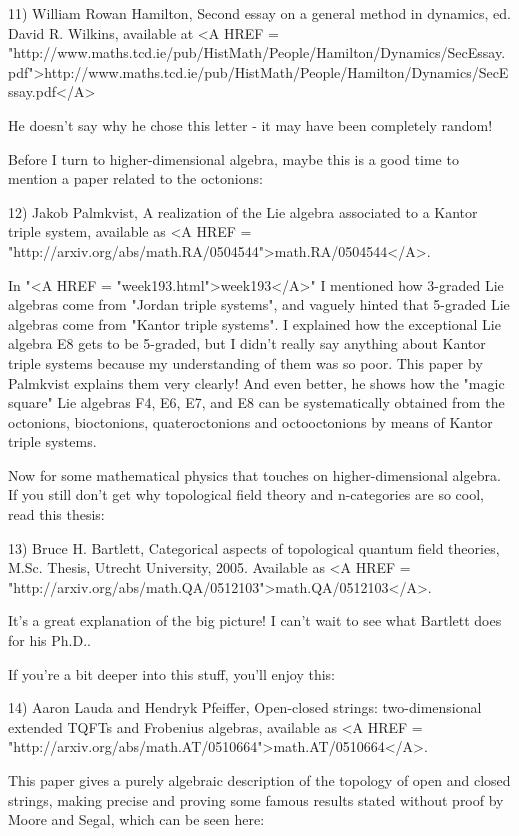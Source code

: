11) William Rowan Hamilton, Second essay on a general method in dynamics,
ed. David R. Wilkins, available at
<A HREF = "http://www.maths.tcd.ie/pub/HistMath/People/Hamilton/Dynamics/SecEssay.pdf">http://www.maths.tcd.ie/pub/HistMath/People/Hamilton/Dynamics/SecEssay.pdf</A>

He doesn't say why he chose this letter - it may have been completely random!

Before I turn to higher-dimensional algebra, maybe this is a good time to
mention a paper related to the octonions:

12) Jakob Palmkvist, A realization of the Lie algebra associated to a 
Kantor triple system, available as <A HREF = "http://arxiv.org/abs/math.RA/0504544">math.RA/0504544</A>.

In "<A HREF = "week193.html">week193</A>" I mentioned how
3-graded Lie algebras come from "Jordan triple systems", and
vaguely hinted that 5-graded Lie algebras come from "Kantor
triple systems".  I explained how the exceptional Lie algebra E8
gets to be 5-graded, but I didn't really say anything about Kantor
triple systems because my understanding of them was so poor.  This
paper by Palmkvist explains them very clearly!  And even better, he
shows how the "magic square" Lie algebras F4, E6, E7, and E8
can be systematically obtained from the octonions, bioctonions,
quateroctonions and octooctonions by means of Kantor triple systems.

Now for some mathematical physics that touches on higher-dimensional
algebra.  If you still don't get why topological field theory and 
n-categories are so cool, read this thesis:

13) Bruce H. Bartlett, Categorical aspects of topological quantum field
theories, M.Sc. Thesis, Utrecht University, 2005.  Available as
<A HREF = "http://arxiv.org/abs/math.QA/0512103">math.QA/0512103</A>.

It's a great explanation of the big picture!  I can't wait to see what 
Bartlett does for his Ph.D..  

If you're a bit deeper into this stuff, you'll enjoy this:

14) Aaron Lauda and Hendryk Pfeiffer, Open-closed strings: two-dimensional
extended TQFTs and Frobenius algebras, available as <A HREF = "http://arxiv.org/abs/math.AT/0510664">math.AT/0510664</A>.

This paper gives a purely algebraic description of the topology of
open and closed strings, making precise and proving some famous results
stated without proof by Moore and Segal, which can be seen here:

